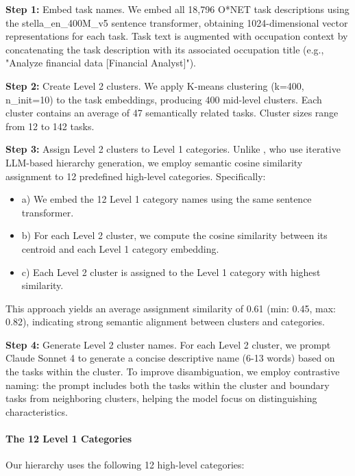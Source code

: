 \documentclass[manuscript,screen,nonacm,oneside]{acmart}
\begin{document}
\textbf{Step 1:} Embed task names. We embed all 18,796 O*NET task descriptions using the stella\_en\_400M\_v5 sentence transformer, obtaining 1024-dimensional vector representations for each task. Task text is augmented with occupation context by concatenating the task description with its associated occupation title (e.g., "Analyze financial data {[}Financial Analyst{]}").

\textbf{Step 2:} Create Level 2 clusters. We apply K-means clustering (k=400, n\_init=10) to the task embeddings, producing 400 mid-level clusters. Each cluster contains an average of 47 semantically related tasks. Cluster sizes range from 12 to 142 tasks.

\textbf{Step 3:} Assign Level 2 clusters to Level 1 categories. Unlike \citet{handa2025which}, who use iterative LLM-based hierarchy generation, we employ semantic cosine similarity assignment to 12 predefined high-level categories. Specifically:

\begin{itemize}
\item
 a) We embed the 12 Level 1 category names using the same sentence transformer.
\item
 b) For each Level 2 cluster, we compute the cosine similarity between its centroid and each Level 1 category embedding.
\item
 c) Each Level 2 cluster is assigned to the Level 1 category with highest similarity.
\end{itemize}

This approach yields an average assignment similarity of 0.61 (min: 0.45, max: 0.82), indicating strong semantic alignment between clusters and categories.

\textbf{Step 4:} Generate Level 2 cluster names. For each Level 2 cluster, we prompt Claude Sonnet 4 to generate a concise descriptive name (6-13 words) based on the tasks within the cluster. To improve disambiguation, we employ contrastive naming: the prompt includes both the tasks within the cluster and boundary tasks from neighboring clusters, helping the model focus on distinguishing characteristics.

\paragraph{The 12 Level 1 Categories}\label{the-12-level-1-categories}

Our hierarchy uses the following 12 high-level categories:
\end{document}

